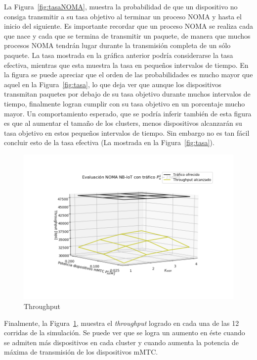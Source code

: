 La Figura~\ref{fig:tasaNOMA}, muestra la probabilidad de que un dispositivo no consiga transmitir a su tasa objetivo al terminar un proceso NOMA y hasta el inicio del siguiente. Es importante recordar que un proceso NOMA se realiza cada que nace y cada que se termina de transmitir un paquete, de manera que muchos procesos NOMA tendrán lugar durante la transmisión completa de un sólo paquete. La tasa mostrada en la gráfica anterior podría considerarse la tasa efectiva, mientras que esta muestra la tasa en pequeños intervalos de tiempo. En la figura se puede apreciar que el orden de las probabilidades es mucho mayor que aquel en la Figura~\ref{fig:tasa}, lo que deja ver que aunque los dispositivos transmitan paquetes por debajo de su tasa objetivo durante muchos intervalos de tiempo, finalmente logran cumplir con su tasa objetivo en un porcentaje mucho mayor. Un comportamiento esperado, que se podría inferir también de esta figura es que al aumentar el tamaño de los clusters, menos dispositivos alcanzarán su tasa objetivo en estos pequeños intervalos de tiempo. Sin embargo no es tan fácil concluir esto de la tasa efectiva (La mostrada en la Figura~\ref{fig:tasa}).\newline

\break

\begin{figure}[th]
    \centering
    \includegraphics[scale=0.8]{Figures/ResultadosTrafico/Figure_4.png}
    \decoRule
    \caption[Throughput]{Throughput}
    \label{fig:throughput2}
\end{figure}

Finalmente, la Figura~\ref{fig:throughput2}, muestra el \textit{throughput} logrado en cada una de las 12 corridas de la simulación. Se puede ver que se logra un aumento en éste cuando se admiten más dispositivos en cada cluster y cuando aumenta la potencia de máxima de transmisión de los dispositivos mMTC.\newline 

